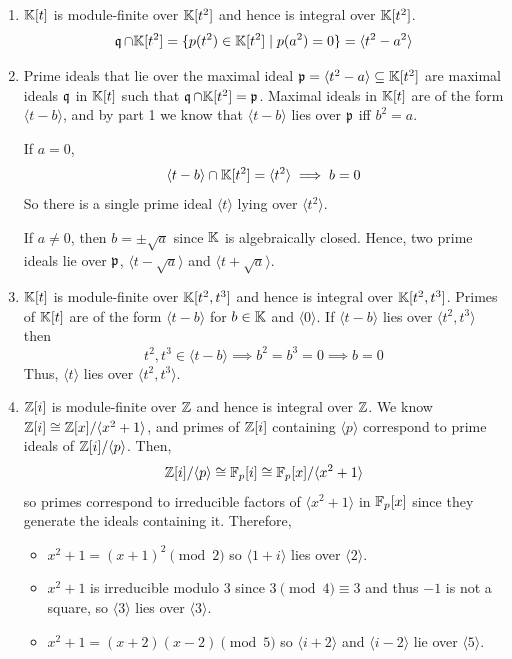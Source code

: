 \documentclass[Notebook.tex]{subfiles}
\begin{document}
\begin{solution}
    \bbni
    \begin{enumerate}
        \item $\mathbb K[t]$ is module-finite over $\mathbb K[t^2]$ and hence is integral over $\mathbb K[t^2]$.  
        \[\operatorname{\mathfrak{q}} \cap \mathbb K[t^2] = \{p(t^2) \in \mathbb K[t^2] \mid p(a^2) = 0\} = \langle t^2 - a^2 \rangle \]

        \item Prime ideals that lie over the maximal ideal $ \operatorname{\mathfrak{p}} =\langle t^2 - a \rangle \subseteq \mathbb K[t^2]$ are maximal ideals $\operatorname{\mathfrak{q}}$ in $\mathbb K[t]$ such that $\operatorname{\mathfrak{q}} \cap \mathbb K[t^2] =  \operatorname{\mathfrak{p}}$. Maximal ideals in $\mathbb K[t]$ are of the form $\langle t - b \rangle$, and by part 1 we know that $\langle t - b \rangle$ lies over $\operatorname{\mathfrak{p}}$ iff $b^2 = a$. 
        
        If $a = 0$, 
        \[\langle t - b \rangle \cap \mathbb K[t^2] = \langle t^2 \rangle \implies b = 0\] 
        So there is a single prime ideal $\langle t \rangle$ lying over $\langle t^2 \rangle$.  

        If $a \neq 0$, then $b = \pm \sqrt{a}$ since $\mathbb K$ is algebraically closed. Hence, two prime ideals lie over $\operatorname{\mathfrak{p}}$, $\langle t - \sqrt{a} \rangle$ and $\langle t + \sqrt{a} \rangle$. 

        \item $\mathbb K[t]$ is module-finite over $\mathbb K[t^2, t^3]$ and hence is integral over $\mathbb K[t^2, t^3]$. Primes of $\mathbb K[t]$ are of the form $\langle t - b \rangle$ for $b \in \mathbb K$ and $\langle 0 \rangle$. If  $\langle t - b \rangle$ lies over $\langle t^2, t^3 \rangle$ then 
        \[t^2, t^3 \in \langle t - b \rangle \implies b^2 = b^3 = 0 \implies b = 0\]
        Thus, $\langle t \rangle$ lies over $\langle t^2, t^3 \rangle$. 


        \item $\mathbb Z[i]$ is module-finite over $\mathbb Z$ and hence is integral over $\mathbb Z$. We know $\mathbb Z[i] \cong \mathbb Z[x]/\langle x^2 + 1 \rangle$, and primes of $\mathbb Z[i]$ containing $\langle p \rangle$ correspond to prime ideals of $\mathbb Z[i]/\langle p \rangle$. Then, 
        \[\mathbb Z[i]/\langle p \rangle \cong \mathbb F_p [i] \cong \mathbb F_p[x]/\langle x^2 + 1 \rangle \]
        so primes correspond to irreducible factors of $\langle x^2 + 1 \rangle$ in $\mathbb F_p[x]$ since they generate the ideals containing it. Therefore, 
        \begin{itemize}
            \item $x^2 + 1  = (x+1)^2  \pmod 2$ so $\langle 1 + i \rangle$ lies over $\langle 2 \rangle$.
            \item $x^2 + 1$ is irreducible modulo $3$ since $3 \pmod 4 \equiv 3$ and thus $-1$ is not a square, so $\langle 3 \rangle$ lies over $\langle 3 \rangle$.
            \item $x^2 + 1 = (x+2)(x-2) \pmod 5$ so $\langle  i + 2\rangle$ and $\langle i - 2\rangle$ lie over $\langle 5 \rangle$.
        \end{itemize} 


\end{enumerate}
\end{solution}
\end{document}
